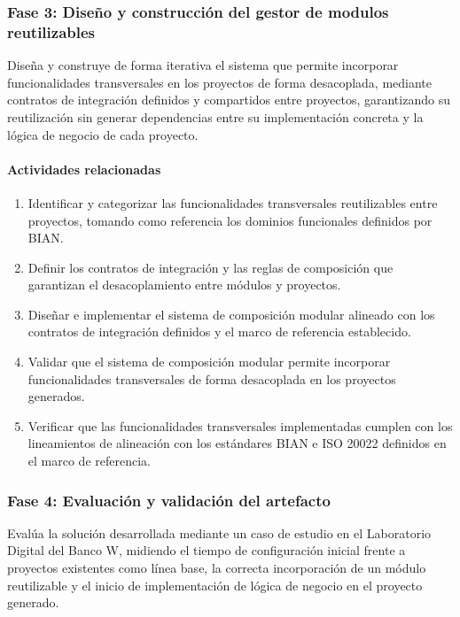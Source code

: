 \subsubsection*{Fase 3: Diseño y construcción del gestor de modulos reutilizables}

Diseña y construye de forma iterativa el sistema que permite incorporar funcionalidades transversales en los proyectos de forma desacoplada, mediante contratos de integración definidos y compartidos entre proyectos, garantizando su reutilización sin generar dependencias entre su implementación concreta y la lógica de negocio de cada proyecto.

\paragraph*{Actividades relacionadas}

\begin{enumerate}
    \item Identificar y categorizar las funcionalidades transversales reutilizables entre proyectos, tomando como referencia los dominios funcionales definidos por BIAN.

    \item Definir los contratos de integración y las reglas de composición que garantizan el desacoplamiento entre módulos y proyectos.

    \item Diseñar e implementar el sistema de composición modular alineado con los contratos de integración definidos y el marco de referencia establecido.

    \item Validar que el sistema de composición modular permite incorporar funcionalidades transversales de forma desacoplada en los proyectos generados.

    \item Verificar que las funcionalidades transversales implementadas cumplen con los lineamientos de alineación con los estándares BIAN e ISO 20022 definidos en el marco de referencia.
\end{enumerate}

\subsubsection*{Fase 4: Evaluación y validación del artefacto}

Evalúa la solución desarrollada mediante un caso de estudio en el Laboratorio Digital del Banco W, midiendo el tiempo de configuración inicial frente a proyectos existentes como línea base, la correcta incorporación de un módulo reutilizable y el inicio de implementación de lógica de negocio en el proyecto generado.

